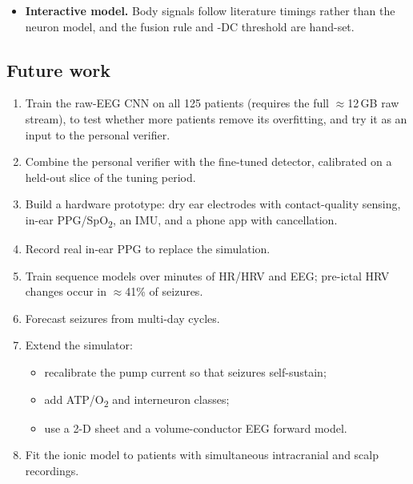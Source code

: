 \begin{itemize}
\begin{itemize}
\item The cluster prior assumes every seizure is confirmed, and the gaps between runs are unknown.
\item Clock-based night mode could not be tested, because SeizeIT2 anonymises start times.
\item The false-alarm types are unsupervised and have no ground-truth artefact labels.
\item The precision figures depend strongly on seizure frequency.
\end{itemize}
\item \textbf{Interactive model.} Body signals follow literature timings rather than the neuron model, and the fusion rule and \Kp-DC threshold are hand-set.
\end{itemize}

\subsection{Future work}

\begin{enumerate}
\item Train the raw-EEG CNN on all 125 patients (requires the full $\approx$12\,GB raw stream), to test whether more patients remove its overfitting, and try it as an input to the personal verifier.
\item Combine the personal verifier with the fine-tuned detector, calibrated on a held-out slice of the tuning period.
\item Build a hardware prototype: dry ear electrodes with contact-quality sensing, in-ear PPG/SpO\textsubscript{2}, an IMU, and a phone app with cancellation.
\item Record real in-ear PPG to replace the simulation.
\item Train sequence models over minutes of HR/HRV and EEG; pre-ictal HRV changes occur in $\approx$41\% of seizures.
\item Forecast seizures from multi-day cycles.
\item Extend the simulator:
\begin{itemize}
\item recalibrate the pump current so that seizures self-sustain;
\item add ATP/O\textsubscript{2} and interneuron classes;
\item use a 2-D sheet and a volume-conductor EEG forward model.
\end{itemize}
\item Fit the ionic model to patients with simultaneous intracranial and scalp recordings.
\end{enumerate}

